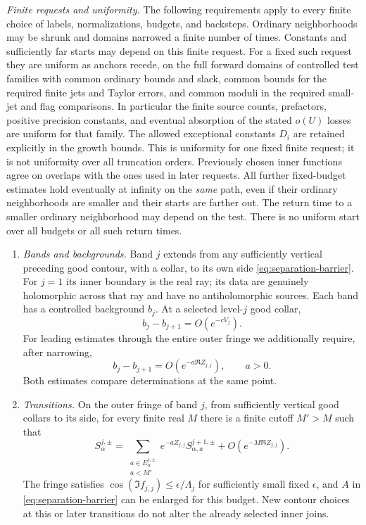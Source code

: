 \begin{definition}
\emph{Finite requests and uniformity.}
The following requirements apply to every finite choice of labels,
normalizations, budgets, and backsteps.  Ordinary neighborhoods may
be shrunk and domains narrowed a finite number of times.  Constants
and sufficiently far starts may depend on this finite request.
For a fixed such request they are uniform as anchors recede, on
the full forward domains of controlled test families with common
ordinary bounds and slack, common bounds for the required finite
jets and Taylor errors, and common moduli in the required small-jet
and flag comparisons.  In particular the finite source counts,
prefactors, positive precision constants, and eventual absorption
of the stated $o(U)$ losses are uniform for that family.  The
allowed exceptional constants $D_i$ are retained explicitly in
the growth bounds.  This is uniformity for one fixed finite
request; it is not uniformity over all truncation orders.
Previously chosen inner functions agree on overlaps with the ones
used in later requests.  All further fixed-budget estimates hold
eventually at infinity on the \emph{same} path, even if their
ordinary neighborhoods are smaller and their starts are farther out.
The return time to a smaller ordinary neighborhood may depend on
the test.  There is no uniform start over all budgets or all such
return times.

\begin{enumerate}
\item \emph{Bands and backgrounds.}
Band $j$ extends from any sufficiently vertical preceding
good contour, with a collar, to its own side
\eqref{eq:separation-barrier}.  For $j=1$ its inner boundary is the
real ray; its data are genuinely holomorphic across that ray and
have no antiholomorphic sources.  Each band has a controlled
background $b_j$.  At a selected level-$j$ good collar,
\begin{equation}\label{eq:separation-background-join}
 b_j-b_{j+1}=O(e^{-cV_j}).
\end{equation}
For leading estimates through the entire outer fringe we additionally
require, after narrowing,
\begin{equation}\label{eq:separation-background-fringe}
 b_j-b_{j+1}=O(e^{-a\Re Z_{j,j}}),\qquad a>0.
\end{equation}
Both estimates compare determinations at the same point.

\item \emph{Transitions.}
On the outer fringe of band $j$, from sufficiently vertical
good collars to its side, for every finite real $M$ there is a finite
cutoff $M'>M$ such that
\begin{equation}\label{eq:separation-transition}
 S^{j,\pm}_{\alpha}
  =\sum_{\substack{a\in E^{j,\pm}_{\alpha}\\a<M'}}
     e^{-aZ_{j,j}}S^{j+1,\pm}_{\alpha,a}
       +O(e^{-M\Re Z_{j,j}}).
\end{equation}
The fringe satisfies
$\cos(\Im f_{j,j})\leq\epsilon/\Lambda_j$ for sufficiently
small fixed $\epsilon$, and $A$ in
\eqref{eq:separation-barrier} can be enlarged for this budget.
New contour choices at this or later transitions do not alter the
already selected inner joins.


\end{enumerate}
\end{definition}
